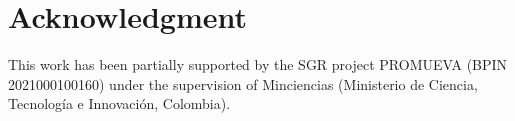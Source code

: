 \documentclass{cleiej}
\theoremstyle{definition}
\theoremstyle{remark}
\begin{document}
\FloatBarrier
\section*{Acknowledgment}
This work has been partially supported by the SGR project PROMUEVA
(BPIN 2021000100160) under the supervision of Minciencias (Ministerio de
Ciencia, Tecnolog\'{i}a e Innovaci\'{o}n, Colombia).



\appendix

\end{document}
